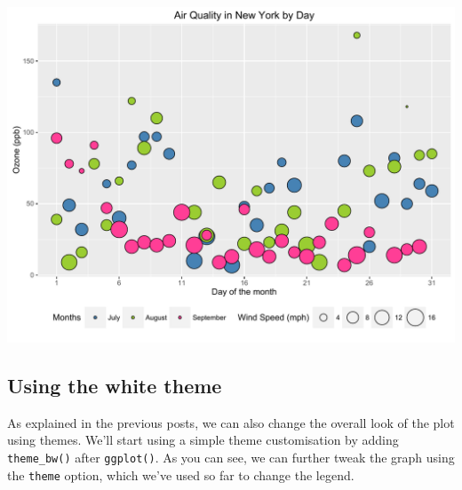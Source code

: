 \documentclass[]{article}
\begin{document}
\begin{center}\includegraphics{0_all_posts_pdf/wscatter_16-1} \end{center}

\subsection{Using the white theme}\label{using-the-white-theme-5}

As explained in the previous posts, we can also change the overall look
of the plot using themes. We'll start using a simple theme customisation
by adding \texttt{theme\_bw()} after \texttt{ggplot()}. As you can see,
we can further tweak the graph using the \texttt{theme} option, which
we've used so far to change the legend.
\end{document}
